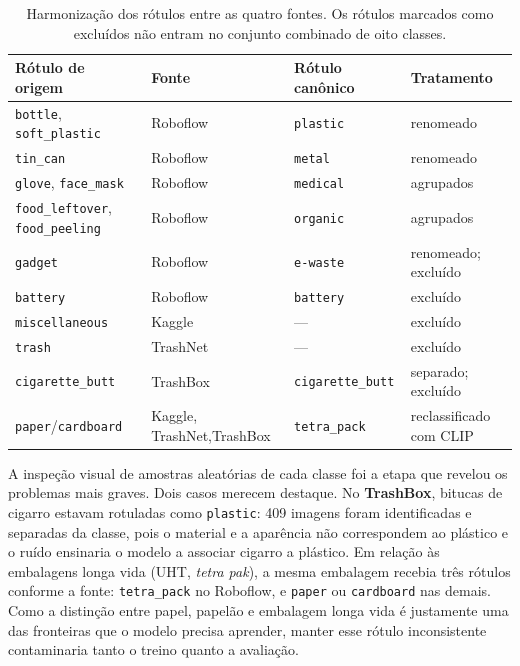 \documentclass[11pt,a4paper]{article}
\begin{document}
	\begin{table}[htbp]
		\centering
		\small
		\caption{Harmonização dos rótulos entre as quatro fontes. Os rótulos marcados como excluídos não entram no conjunto combinado de oito classes.}
		\label{tab:rotulos}
		\setlength{\tabcolsep}{4pt}
		\begin{tabular}{p{3.8cm}p{3.0cm}p{2.8cm}p{4.2cm}}
			\toprule
			\textbf{Rótulo de origem} & \textbf{Fonte} & \textbf{Rótulo canônico} & \textbf{Tratamento} \\
			\midrule
			\texttt{bottle}, \texttt{soft\_plastic} & Roboflow & \texttt{plastic} & renomeado \\
			\texttt{tin\_can} & Roboflow & \texttt{metal} & renomeado \\
			\texttt{glove}, \texttt{face\_mask} & Roboflow & \texttt{medical} & agrupados \\
			\texttt{food\_leftover}, \texttt{food\_peeling} & Roboflow & \texttt{organic} & agrupados \\
			\texttt{gadget} & Roboflow & \texttt{e-waste} & renomeado; excluído \\
			\texttt{battery} & Roboflow & \texttt{battery} & excluído \\
			\texttt{miscellaneous} & Kaggle & --- & excluído \\
			\texttt{trash} & TrashNet & --- & excluído \\
			\texttt{cigarette\_butt} & TrashBox & \texttt{cigarette\_butt} & separado; excluído \\
			\texttt{paper}/\texttt{cardboard} & Kaggle, TrashNet,\newline TrashBox & \texttt{tetra\_pack} & reclassificado com CLIP \\
			\bottomrule
		\end{tabular}
	\end{table}
	
	A inspeção visual de amostras aleatórias de cada classe foi a etapa que revelou os problemas mais graves. Dois casos merecem destaque. No \textbf{TrashBox}, bitucas de cigarro estavam rotuladas como \texttt{plastic}: 409 imagens foram identificadas e separadas da classe, pois o material e a aparência não correspondem ao plástico e o ruído ensinaria o modelo a associar cigarro a plástico. Em relação às embalagens longa vida (UHT, \emph{tetra pak}), a mesma embalagem recebia três rótulos conforme a fonte: \texttt{tetra\_pack} no Roboflow, e \texttt{paper} ou \texttt{cardboard} nas demais. Como a distinção entre papel, papelão e embalagem longa vida é justamente uma das fronteiras que o modelo precisa aprender, manter esse rótulo inconsistente contaminaria tanto o treino quanto a avaliação.
	
\end{document}
